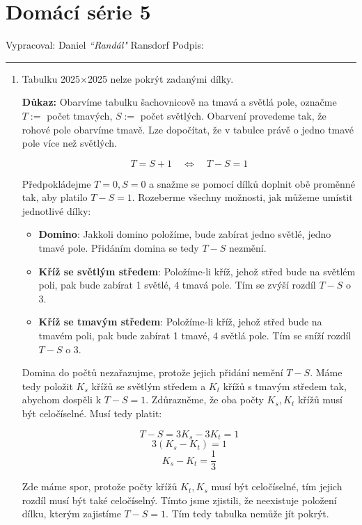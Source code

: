 \documentclass[12pt]{article}
\begin{document}
\section*{Domácí série 5}

Vypracoval: Daniel \textit{``Randál"} Ransdorf \hfill Podpis: \rule{4cm}{0.4pt}

\begin{enumerate}
  \item Tabulku 2025$\times$2025 nelze pokrýt zadanými dílky.

    \textbf{Důkaz:}
    Obarvíme tabulku šachovnicově na tmavá a světlá pole, označme
    $T:=$ počet tmavých, $S:=$ počet světlých. Obarvení provedeme tak, že rohové pole obarvíme tmavě.
    Lze dopočítat, že v tabulce právě o jedno tmavé pole více než světlých.

    \[
      T = S+1 \quad \Longleftrightarrow \quad T-S = 1
    \]

    Předpokládejme $T=0,S=0$ a snažme se pomocí dílků doplnit obě proměnné tak, aby platilo $T-S=1$.
    Rozeberme všechny možnosti, jak můžeme umístit jednotlivé dílky:

    \begin{itemize}
      \item \textbf{Domino}: Jakkoli domino položíme, bude zabírat jedno světlé, jedno tmavé pole.
        Přidáním domina se tedy $T-S$ nezmění.
      \item \textbf{Kříž se světlým středem}: Položíme-li kříž, jehož střed bude na světlém poli,
        pak bude zabírat 1 světlé, 4 tmavá pole. Tím se zvýší rozdíl $T-S$ o 3.
      \item \textbf{Kříž se tmavým středem}: Položíme-li kříž, jehož střed bude na tmavém poli,
        pak bude zabírat 1 tmavé, 4 světlá pole. Tím se sníží rozdíl $T-S$ o 3.
    \end{itemize}

    Domina do počtů nezařazujme, protože jejich přidání nemění $T-S$. Máme tedy položit $K_s$ křížů se světlým středem a $K_t$ křížů
    s tmavým středem tak, abychom dospěli k $T-S=1$. Zdůrazněme, že oba počty $K_s,K_t$ křížů musí být celočíselné. Musí tedy platit:

    \[
      T-S = 3K_s - 3K_t = 1
    \]
    \[
      3(K_s - K_t) = 1
    \]
    \[
      K_s - K_t = \frac{1}{3}
    \]

    Zde máme spor, protože počty křížů $K_t,K_s$ musí být celočíselné, tím jejich rozdíl musí být také celočíselný.
    Tímto jsme zjistili, že neexistuje položení dílku, kterým zajistíme $T-S=1$. Tím tedy tabulka nemůže jít pokrýt.


\end{enumerate}
\end{document}
